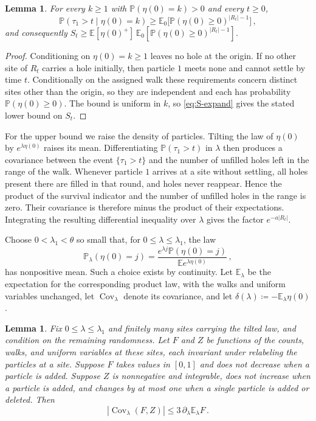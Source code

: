 \documentclass[11pt]{amsart}
\theoremstyle{plain}
\newtheorem{lemma}[theorem]{Lemma}
\theoremstyle{definition}
\newcommand{\E}{\mathbb{E}}
\renewcommand{\P}{\mathbb{P}}
\DeclareMathOperator{\Cov}{Cov}
\begin{document}
\begin{lemma}\label{lem:range-lower}
	For every $k\geq1$ with
	$\P(\eta(0)=k)>0$ and every $t\geq0$,
	\[
		\P(\tau_1>t\mid\eta(0)=k)\geq\E_0\bigl[\P(\eta(0)\geq0)^{|R_t|-1}\bigr]\,,
	\]
	and consequently
	$S_t\geq\E[\eta(0)^+]\,\E_0[\P(\eta(0)\geq0)^{|R_t|-1}]$.
\end{lemma}

\begin{proof}
	Conditioning on $\eta(0)=k\geq1$ leaves no hole at the origin. If no other
	site of $R_t$ carries a hole initially, then particle $1$ meets none and
	cannot settle by time $t$. Conditionally on the assigned walk these
	requirements concern distinct sites other than the origin, so they are
	independent and each has probability $\P(\eta(0)\geq0)$. The bound is
	uniform in $k$, so \eqref{eq:S-expand} gives the stated lower bound on $S_t$.
\end{proof}

For the upper bound we raise the density of particles. Tilting the law of
$\eta(0)$ by $e^{\lambda\eta(0)}$ raises its mean. Differentiating
$\P(\tau_1>t)$ in $\lambda$ then produces a covariance between the event
$\{\tau_1>t\}$ and the number of unfilled holes left in the range of the walk.
Whenever particle $1$ arrives at a site without settling, all holes present
there are filled in that round, and holes never reappear. Hence the product of
the survival indicator and the number of unfilled holes in the range is zero.
Their covariance is therefore minus the product of their expectations.
Integrating the resulting differential inequality over $\lambda$ gives the
factor $e^{-a|R_t|}$.

Choose $0<\lambda_1<\theta$ so small that, for $0\leq\lambda\leq\lambda_1$, the
law
\[
	\P_\lambda(\eta(0)=j)
	=\frac{e^{\lambda j}\P(\eta(0)=j)}{\E e^{\lambda\eta(0)}}\,,
\]
has nonpositive mean. Such a choice exists by continuity. Let $\E_\lambda$
be the expectation for the corresponding product law, with the walks and
uniform variables unchanged, let $\Cov_\lambda$ denote its covariance, and let
$\delta(\lambda)\coloneqq-\E_\lambda\eta(0)$.

\begin{lemma}\label{lem:product}
	Fix $0\leq\lambda\leq\lambda_1$ and finitely many sites carrying the tilted
	law, and condition on the remaining randomness. Let $F$ and $Z$ be functions
	of the counts, walks, and uniform variables at these sites, each
	invariant under relabeling the particles at a site. Suppose $F$ takes values in $[0,1]$ and
	does not decrease when a particle is added. Suppose $Z$ is nonnegative and
	integrable, does not increase when a particle is added, and changes by at
	most one when a single particle is added or deleted. Then
	\begin{equation}\label{eq:cov}
		|\Cov_\lambda(F,Z)|\leq3\,\partial_\lambda\E_\lambda F\,.
	\end{equation}
\end{lemma}
\end{document}

